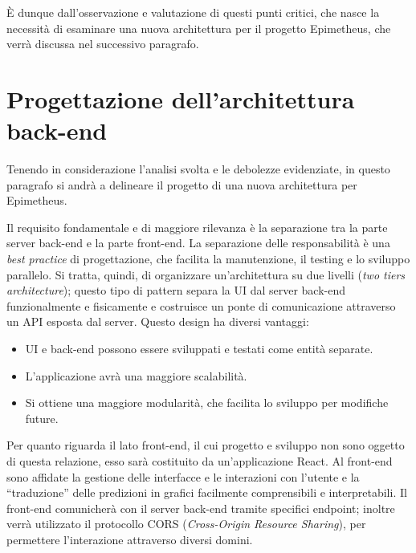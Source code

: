 È dunque dall'osservazione e valutazione di questi punti critici, che nasce la necessità di esaminare una nuova architettura per il progetto Epimetheus, che verrà discussa nel successivo paragrafo.

\section{Progettazione dell'architettura back-end}
\label{sec:architettura}

Tenendo in considerazione l’analisi svolta e le debolezze evidenziate, in questo paragrafo si andrà a delineare il progetto di una nuova architettura per Epimetheus.

Il requisito fondamentale e di maggiore rilevanza è la separazione tra la parte server back-end e la parte front-end. 
\newline
La separazione delle responsabilità è una \textit{best practice} di progettazione, che facilita la manutenzione, il testing e lo sviluppo parallelo.
\newline
Si tratta, quindi, di organizzare un'architettura su due livelli (\textit{two tiers architecture}); questo tipo di pattern separa la UI dal server back-end funzionalmente e fisicamente e costruisce un ponte di comunicazione attraverso un API esposta dal server. 
\newline 
Questo design ha diversi vantaggi:
\begin{itemize}
    \item UI e back-end possono essere sviluppati e testati come entità separate.
    \item L’applicazione avrà una maggiore scalabilità.
    \item Si ottiene una maggiore modularità, che facilita lo sviluppo per modifiche future.
\end{itemize}
Per quanto riguarda il lato front-end, il cui progetto e sviluppo non sono oggetto di questa relazione, esso sarà costituito da un'applicazione React. Al front-end sono affidate la gestione delle interfacce e le interazioni con l’utente e la “traduzione” delle predizioni in grafici facilmente comprensibili e interpretabili.
\newline
Il front-end comunicherà con il server back-end tramite specifici endpoint; inoltre verrà utilizzato il protocollo CORS (\textit{Cross-Origin Resource Sharing}), per permettere l’interazione attraverso diversi domini.

